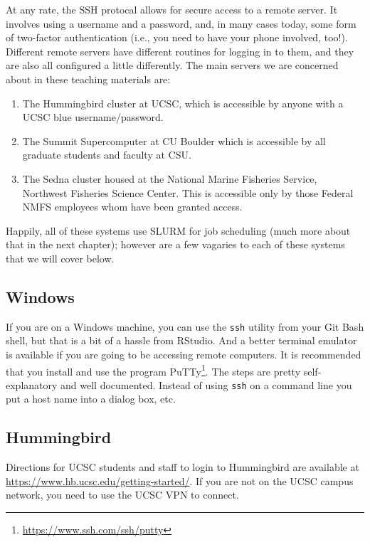 \documentclass[]{krantz}
\providecommand{\tightlist}{%
  \setlength{\itemsep}{0pt}\setlength{\parskip}{0pt}}
\renewcommand{\href}[2]{#2\footnote{\url{#1}}}
\begin{document}
At any rate, the SSH protocal allows for secure access to a remote server. It involves
using a username and a password, and, in many cases today, some form of two-factor
authentication (i.e., you need to have your phone involved, too!). Different
remote servers have different routines for logging in to them, and they are also
all configured a little differently. The main servers we are concerned about in
these teaching materials are:

\begin{enumerate}
\def\labelenumi{\arabic{enumi}.}
\tightlist
\item
  The Hummingbird cluster at UCSC, which is accessible by anyone with a UCSC blue username/password.
\item
  The Summit Supercomputer at CU Boulder which is accessible by all graduate students and
  faculty at CSU.
\item
  The Sedna cluster housed at the National Marine Fisheries Service, Northwest Fisheries Science
  Center. This is accessible only by those Federal NMFS employees whom have been granted access.
\end{enumerate}

Happily, all of these systems use SLURM for job scheduling (much more about that in the
next chapter); however are a few vagaries to each of these systems that we will cover below.

\hypertarget{windows}{%
\subsection{Windows}\label{windows}}

If you are on a Windows machine, you can use the \texttt{ssh} utility from your Git Bash shell, but
that is a bit of a hassle from RStudio. And a better terminal emulator is available if you
are going to be accessing remote computers. It is recommended that you install and
use the program \href{https://www.ssh.com/ssh/putty}{PuTTy}. The steps are pretty self-explanatory
and well documented. Instead of using \texttt{ssh} on a command line you put a host name into
a dialog box, etc.

\hypertarget{hummingbird}{%
\subsection{Hummingbird}\label{hummingbird}}

Directions for UCSC students and staff to login to Hummingbird are available
at \url{https://www.hb.ucsc.edu/getting-started/}.
If you are not on the UCSC campus network, you need to use the UCSC VPN to connect.
\end{document}
